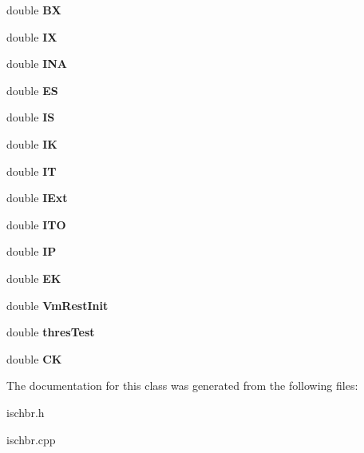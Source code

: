 \begin{DoxyCompactItemize}
\item 
double {\bfseries BX}\hypertarget{classIschBR_a0801c50d96785725e4a9644043e481a3}{}\label{classIschBR_a0801c50d96785725e4a9644043e481a3}

\item 
double {\bfseries IX}\hypertarget{classIschBR_a042a0f48611f02e7dc6a0ac21a3eaa24}{}\label{classIschBR_a042a0f48611f02e7dc6a0ac21a3eaa24}

\item 
double {\bfseries I\+NA}\hypertarget{classIschBR_a017d43abb618770507839344dcf83fbc}{}\label{classIschBR_a017d43abb618770507839344dcf83fbc}

\item 
double {\bfseries ES}\hypertarget{classIschBR_ae9b4bee435f26989bb766202e18ee01f}{}\label{classIschBR_ae9b4bee435f26989bb766202e18ee01f}

\item 
double {\bfseries IS}\hypertarget{classIschBR_a137a6877304a94b1806c8ef5883dc0b6}{}\label{classIschBR_a137a6877304a94b1806c8ef5883dc0b6}

\item 
double {\bfseries IK}\hypertarget{classIschBR_a36ea00bb9bce2fc276cd79fe5c1fb34b}{}\label{classIschBR_a36ea00bb9bce2fc276cd79fe5c1fb34b}

\item 
double {\bfseries IT}\hypertarget{classIschBR_aff8f0bafc649d17841382e9e28a5a0e8}{}\label{classIschBR_aff8f0bafc649d17841382e9e28a5a0e8}

\item 
double {\bfseries I\+Ext}\hypertarget{classIschBR_a11cb478d7707e5ac03bf05fe1eb37133}{}\label{classIschBR_a11cb478d7707e5ac03bf05fe1eb37133}

\item 
double {\bfseries I\+TO}\hypertarget{classIschBR_ac900df9d9370c285d46f741a5a3d8a00}{}\label{classIschBR_ac900df9d9370c285d46f741a5a3d8a00}

\item 
double {\bfseries IP}\hypertarget{classIschBR_ae21feab21e460e34462edd9ffa100f11}{}\label{classIschBR_ae21feab21e460e34462edd9ffa100f11}

\item 
double {\bfseries EK}\hypertarget{classIschBR_af4201065e7aa823862b40ae505fbe3e5}{}\label{classIschBR_af4201065e7aa823862b40ae505fbe3e5}

\item 
double {\bfseries Vm\+Rest\+Init}\hypertarget{classIschBR_a0e9a299f41cd43a120746a3a17b3aeb5}{}\label{classIschBR_a0e9a299f41cd43a120746a3a17b3aeb5}

\item 
double {\bfseries thres\+Test}\hypertarget{classIschBR_a61a864c85cd43532dbd34f4b5ccb34b0}{}\label{classIschBR_a61a864c85cd43532dbd34f4b5ccb34b0}

\item 
double {\bfseries CK}\hypertarget{classIschBR_a6916ae5b937f60f6489f5744f8098b4a}{}\label{classIschBR_a6916ae5b937f60f6489f5744f8098b4a}

\end{DoxyCompactItemize}


The documentation for this class was generated from the following files\+:\begin{DoxyCompactItemize}
\item 
ischbr.\+h\item 
ischbr.\+cpp\end{DoxyCompactItemize}

